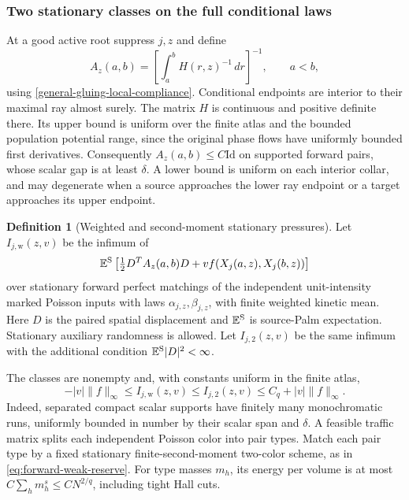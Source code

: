 \documentclass[11pt,reqno]{amsart}
\theoremstyle{definition}
\newtheorem{definition}[theorem]{Definition}
\theoremstyle{remark}
\numberwithin{equation}{section}
\newcommand{\E}{\mathbb E}
\begin{document}
\subsubsection{Two stationary classes on the full conditional laws}

At a good active root suppress \(j,z\) and define
\begin{equation}
\label{general-gluing-full-matrix}
 A_z(a,b)=\left[\int_a^b H(r,z)^{-1}\,dr\right]^{-1},
 \qquad a<b,
\end{equation}
using \eqref{general-gluing-local-compliance}. Conditional endpoints are
interior to their maximal ray almost surely. The matrix \(H\) is continuous
and positive definite there. Its upper bound is uniform over the finite
atlas and the bounded population potential range, since the original phase
flows have uniformly bounded first derivatives. Consequently
\(A_z(a,b)\le C\mathrm{Id}\) on supported forward pairs, whose scalar
gap is at least \(\delta\). A lower bound is uniform on each interior
collar, and may degenerate when a source approaches the lower ray endpoint
or a target approaches its upper endpoint.

\begin{definition}[Weighted and second-moment stationary pressures]
\label{general-gluing-two-classes}
Let \(I_{j,\mathrm w}(z,v)\) be the infimum of
\begin{equation}
\label{general-gluing-stationary-cost}
 \E^{\rm S}\left[
    \tfrac12 D^TA_z(a,b)D+v f(X_j(a,z),X_j(b,z))\right]
\end{equation}
over stationary forward perfect matchings of the independent unit-intensity
marked Poisson inputs with laws \(\alpha_{j,z},\beta_{j,z}\), with finite
weighted kinetic mean. Here \(D\) is the paired spatial displacement and
\(\E^{\rm S}\) is source-Palm expectation. Stationary auxiliary randomness
is allowed. Let \(I_{j,2}(z,v)\) be the same infimum with the additional
condition \(\E^{\rm S}|D|^2<\infty\).
\end{definition}

The classes are nonempty and, with constants uniform in the finite atlas,
\begin{equation}
\label{general-gluing-uniform-pressure-bounds}
 -|v|\|f\|_\infty\le I_{j,\mathrm w}(z,v)
   \le I_{j,2}(z,v)\le C_q+|v|\|f\|_\infty.
\end{equation}
Indeed, separated compact scalar supports have finitely many monochromatic
runs, uniformly bounded in number by their scalar span and \(\delta\).
A feasible traffic matrix splits each independent Poisson color into pair
types. Match each pair type by a fixed stationary finite-second-moment
two-color scheme, as in \eqref{eq:forward-weak-reserve}. For type masses
\(m_h\), its energy per volume is at most
\(C\sum_hm_h^s\le C N^{2/q}\), including tight Hall cuts.
\end{document}
